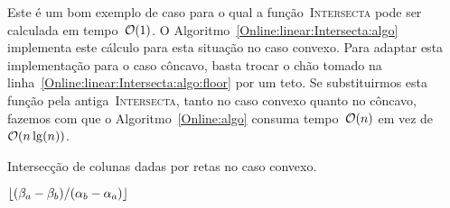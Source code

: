 Este é um bom exemplo de caso para o qual a função~\textsc{Intersecta} pode ser calculada em tempo~$\mathcal{O}(1)$. O Algoritmo~\ref{Online:linear:Intersecta:algo} implementa este cálculo para esta situação no caso convexo. Para adaptar esta implementação para o caso côncavo, basta trocar o chão tomado na linha~\ref{Online:linear:Intersecta:algo:floor} por um teto. Se substituirmos esta função pela antiga~\textsc{Intersecta}, tanto no caso convexo quanto no côncavo, fazemos com que o Algoritmo~\ref{Online:algo} consuma tempo~$\mathcal{O}(n)$ em vez de~$\mathcal{O}(n\lg(n))$.


\begin{algorithm}[h]
\caption{Intersecção de colunas dadas por retas no caso convexo. }
\label{Online:linear:Intersecta:algo}
\begin{algorithmic}[1]
    \State \Return $\lfloor(\beta_a - \beta_b)/(\alpha_b - \alpha_a)\rfloor$ \label{Online:linear:Intersecta:algo:floor}
\EndFunction
\end{algorithmic}
\end{algorithm}
